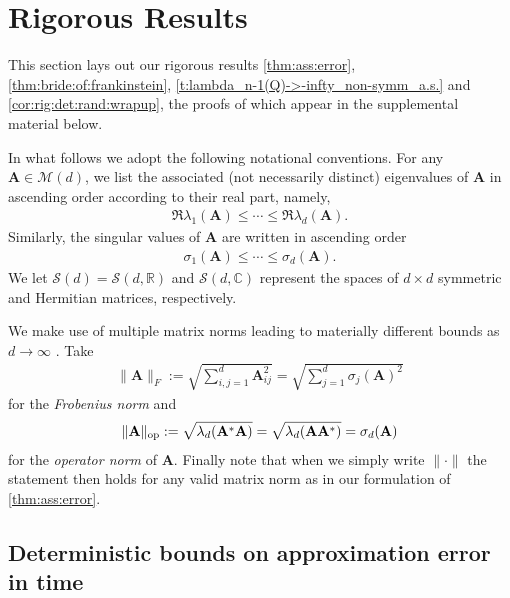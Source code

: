 \documentclass[9pt,twocolumn,twoside]{pnas-new}
\newcommand{\bbR}{{\mathbb R}}
\newcommand{\bbC}{{\mathbb C}}
\newcommand{\?}{\textbf{?}}
\begin{document}
\section{Rigorous Results}
\label{sec:rig:results}

This section lays out our rigorous results \cref{thm:ass:error},
\cref{thm:bride:of:frankinstein},
\cref{t:lambda_n-1(Q)->-infty_non-symm_a.s.} and
\cref{cor:rig:det:rand:wrapup}, the proofs of which appear in the
supplemental material below.

In what follows we adopt the following notational conventions. For any
${\mathbf A} \in {\mathcal M}(d)$, we list the associated (not
necessarily distinct) eigenvalues of $\mathbf{A}$ in ascending order
according to their real part, namely,
\begin{align}\label{eq:EV:real:ass}
  \Re \lambda_1({\mathbf A}) \leq \cdots \leq \Re \lambda_d({\mathbf A}).
\end{align}
Similarly, the singular values of ${\mathbf A}$ are written in
ascending order
\begin{align}\label{eq:SV:ass}
  \sigma_1({\mathbf A}) \leq \cdots \leq \sigma_d({\mathbf A}).
\end{align}
We let ${\mathcal S}(d) = {\mathcal S}(d,\bbR)$ and ${\mathcal S}(d,\bbC)$ represent the spaces of $d \times d$ symmetric and Hermitian matrices,
respectively.

We make use of multiple matrix norms leading to
materially different bounds as $d \rightarrow \infty$ \cite{trefethen2022numerical}.  Take
\begin{align}\label{eq:frob:norm}
  \|\mathbf{A}\|_{F} := \sqrt{\sum_{i,j =1}^d \mathbf{A}_{ij}^2} =
  \sqrt{\sum_{j =1}^d \sigma_j(\mathbf{A})^2}
\end{align}
for the \emph{Frobenius norm} and
\begin{align}\label{eq:op:norm}
  \|{\mathbf A}\|_{\textnormal{op}} :=  \sqrt{\lambda_d({\mathbf
  A}^*{\mathbf A})} = \sqrt{\lambda_d({\mathbf A}{\mathbf A}^*)}
  = \sigma_d(\mathbf{A})
\end{align}
for the \emph{operator norm} of ${\mathbf A}$.  Finally note that when we
simply write $\| \cdot \|$ the statement then holds for any valid
matrix norm as in our formulation of \cref{thm:ass:error}.

\subsection*{Deterministic bounds on approximation
  error in time}
\end{document}
